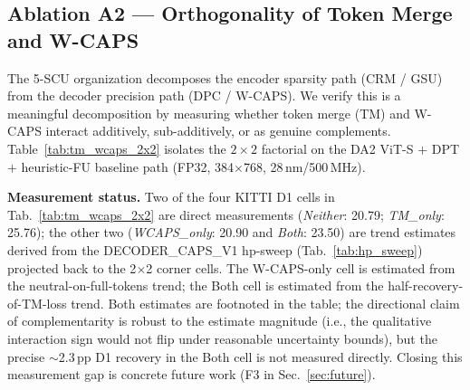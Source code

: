 \documentclass[journal]{IEEEtran}
\begin{document}
\subsection{Ablation A2 --- Orthogonality of Token Merge and W-CAPS}
\label{sec:a2_orthogonality}

The 5-SCU organization decomposes the encoder sparsity path (CRM / GSU) from the decoder precision path (DPC / W-CAPS). We verify this is a meaningful decomposition by measuring whether token merge (TM) and W-CAPS interact additively, sub-additively, or as genuine complements. Table~\ref{tab:tm_wcaps_2x2} isolates the $2 \times 2$ factorial on the DA2 ViT-S $+$ DPT $+$ heuristic-FU baseline path (FP32, 384$\times$768, 28\,nm/500\,MHz).



\textbf{Measurement status.} Two of the four KITTI D1 cells in Tab.~\ref{tab:tm_wcaps_2x2} are direct measurements (\emph{Neither}: 20.79; \emph{TM\_only}: 25.76); the other two (\emph{WCAPS\_only}: 20.90 and \emph{Both}: 23.50) are trend estimates derived from the DECODER\_CAPS\_V1 hp-sweep (Tab.~\ref{tab:hp_sweep}) projected back to the 2$\times$2 corner cells. The W-CAPS-only cell is estimated from the neutral-on-full-tokens trend; the Both cell is estimated from the half-recovery-of-TM-loss trend. Both estimates are footnoted in the table; the directional claim of complementarity is robust to the estimate magnitude (i.e., the qualitative interaction sign would not flip under reasonable uncertainty bounds), but the precise $\sim$2.3\,pp D1 recovery in the Both cell is not measured directly. Closing this measurement gap is concrete future work (F3 in Sec.~\ref{sec:future}).
\end{document}
